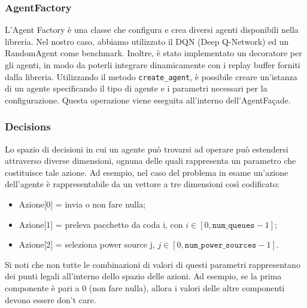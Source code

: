 \documentclass[conference]{IEEEtran}
\newcommand{\code}[1]{\texttt{#1}}
\begin{document}
\subsubsection{AgentFactory}
L'Agent Factory è una classe che configura e crea diversi agenti disponibili nella libreria. Nel nostro caso, abbiamo utilizzato il DQN (Deep Q-Network) ed un RandomAgent come benchmark. Inoltre, è stato implementato un decoratore per gli agenti, in modo da poterli integrare dinamicamente con i replay buffer forniti dalla libreria. Utilizzando il metodo \code{create\_agent}, è possibile creare un'istanza di un agente specificando il tipo di agente e i parametri necessari per la configurazione. Questa operazione viene eseguita all'interno dell'AgentFaçade.

\subsubsection{Decisions}
\label{subsec:Decisions}
Lo spazio di decisioni in cui un agente può trovarsi ad operare può estendersi
attraverso
diverse dimensioni, ognuna delle quali rappresenta un parametro che costituisce
tale azione. Ad esempio, nel caso del problema in esame un'azione dell'agente è
rappresentabile da un vettore a tre dimensioni così codificato:
\begin{itemize}
\item Azione[0] = invia o non fare nulla;
\item Azione[1] = preleva pacchetto da coda i, con $i \in [0, \code{num\_queues} - 1]$;
\item Azione[2] = seleziona power source j, $j \in [0, \code{num\_power\_sources} - 1]$.
\end{itemize}
Si noti che non tutte le combinazioni di valori di questi parametri
rappresentano dei punti legali all'interno dello spazio delle azioni.
Ad esempio, se la prima componente è pari a 0 (non fare nulla), allora i valori delle
altre componenti devono essere don't care.
\end{document}
